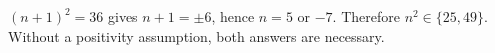 $(n+1)^2=36 $ gives $ n+1=\pm6 $, hence $ n=5 $ or $-7 $. Therefore $\boxed{n^2\in\{25,49\}}$. Without a positivity assumption, both answers are necessary.
